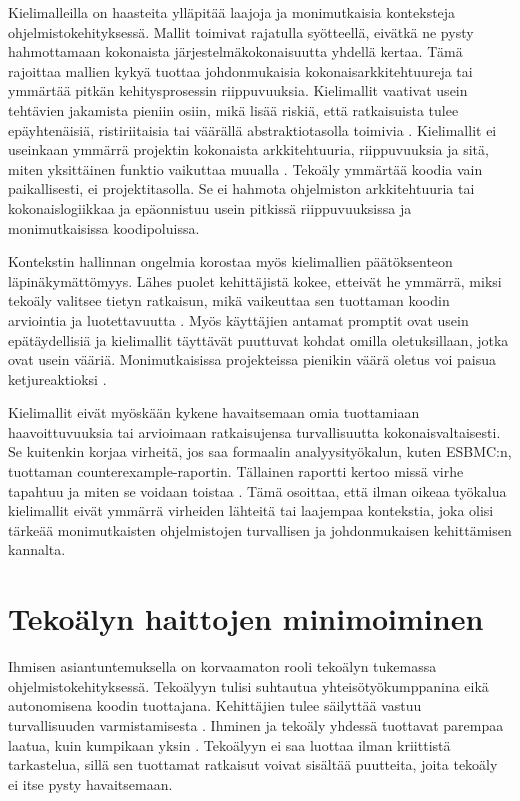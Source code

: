 \documentclass[utf8,bachelor]{gradu3}
\begin{document}
Kielimalleilla on haasteita ylläpitää laajoja ja monimutkaisia konteksteja ohjelmistokehityksessä. Mallit toimivat rajatulla syötteellä, eivätkä ne pysty hahmottamaan kokonaista järjestelmäkokonaisuutta yhdellä kertaa. Tämä rajoittaa mallien kykyä tuottaa johdonmukaisia kokonaisarkkitehtuureja tai ymmärtää pitkän kehitysprosessin riippuvuuksia. Kielimallit vaativat usein tehtävien jakamista pieniin osiin, mikä lisää riskiä, että ratkaisuista tulee epäyhtenäisiä, ristiriitaisia tai väärällä abstraktiotasolla toimivia \parencite{belzner_large_nodate}. Kielimallit ei useinkaan ymmärrä projektin kokonaista arkkitehtuuria, riippuvuuksia ja sitä, miten yksittäinen funktio vaikuttaa muualla \parencite{fu_security_2025}. Tekoäly ymmärtää koodia vain paikallisesti, ei projektitasolla. Se ei hahmota ohjelmiston arkkitehtuuria tai kokonaislogiikkaa ja epäonnistuu usein pitkissä riippuvuuksissa ja monimutkaisissa koodipoluissa. \parencite{gu_challenges_2025}

Kontekstin hallinnan ongelmia korostaa myös kielimallien päätöksenteon läpinäkymättömyys. Lähes puolet kehittäjistä kokee, etteivät he ymmärrä, miksi tekoäly valitsee tietyn ratkaisun, mikä vaikeuttaa sen tuottaman koodin arviointia ja luotettavuutta \parencite{staff_survey_2023}. Myös käyttäjien antamat promptit ovat usein epätäydellisiä ja kielimallit täyttävät puuttuvat kohdat omilla oletuksillaan, jotka ovat usein vääriä. Monimutkaisissa projekteissa pienikin väärä oletus voi paisua ketjureaktioksi \parencite{gu_challenges_2025}.

Kielimallit eivät myöskään kykene havaitsemaan omia tuottamiaan haavoittuvuuksia tai arvioimaan ratkaisujensa turvallisuutta kokonaisvaltaisesti. Se kuitenkin korjaa virheitä, jos saa formaalin analyysityökalun, kuten ESBMC:n, tuottaman counterexample-raportin. Tällainen raportti kertoo missä virhe tapahtuu ja miten se voidaan toistaa \parencite{tihanyi_formai_2023}. Tämä osoittaa, että ilman oikeaa työkalua kielimallit eivät ymmärrä virheiden lähteitä tai laajempaa kontekstia, joka olisi tärkeää monimutkaisten ohjelmistojen turvallisen ja johdonmukaisen kehittämisen kannalta.

\chapter{Tekoälyn haittojen minimoiminen}

Ihmisen asiantuntemuksella on korvaamaton rooli tekoälyn tukemassa ohjelmistokehityksessä. Tekoälyyn tulisi suhtautua yhteisötyökumppanina eikä autonomisena koodin tuottajana. Kehittäjien tulee säilyttää vastuu turvallisuuden varmistamisesta \parencite{shukla_security_2025}. Ihminen ja tekoäly yhdessä tuottavat parempaa laatua, kuin kumpikaan yksin \parencite{jarrahi_artificial_2018}. Tekoälyyn ei saa luottaa ilman kriittistä tarkastelua, sillä sen tuottamat ratkaisut voivat sisältää puutteita, joita tekoäly ei itse pysty havaitsemaan.
\end{document}
